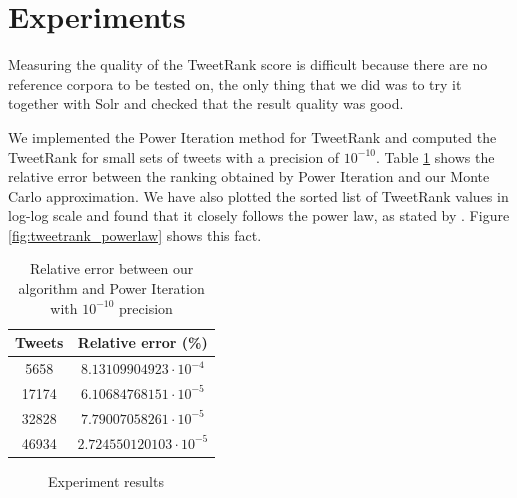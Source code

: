 \section{Experiments}
Measuring the quality of the TweetRank score is difficult because there are no reference corpora to be tested on, the only thing that we did was to try it together with Solr and checked that the result quality was good.

We implemented the Power Iteration method for TweetRank and computed the TweetRank for small sets of tweets with a precision of $10^{-10}$. Table \ref{table:mc_errors} shows the relative error between the ranking obtained by Power Iteration and our Monte Carlo approximation. We have also plotted the sorted list of TweetRank values in log-log scale and found that it closely follows the power law, as stated by \cite{Avrachenkov:2007:MCM:1272804.1272825}. Figure \ref{fig:tweetrank_powerlaw} shows this fact.

\begin{table}
\centering
\begin{tabular}{|c|c|}
\hline Tweets & Relative error (\%) \\
\hline 5658 & $8.13109904923 \cdot 10^{-4}$ \\
\hline 17174 & $6.10684768151 \cdot 10^{-5}$ \\
\hline 32828 & $7.79007058261 \cdot 10^{-5}$ \\
\hline 46934 & $2.724550120103 \cdot 10^{-5}$ \\
\hline
\end{tabular}
\caption{Relative error between our algorithm and Power Iteration with $10^{-10}$ precision}
\label{table:mc_errors}
\end{table}

\begin{figure}
\centering
{}
\qquad
{} 
\caption{Experiment results}
\end{figure}

